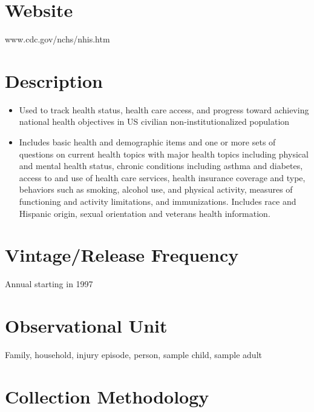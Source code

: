 \documentclass[
]{book}
\providecommand{\tightlist}{%
  \setlength{\itemsep}{0pt}\setlength{\parskip}{0pt}}
\begin{document}
\hypertarget{website-51}{%
\section{Website}\label{website-51}}

www.cdc.gov/nchs/nhis.htm

\hypertarget{description-51}{%
\section{Description}\label{description-51}}

\begin{itemize}
\tightlist
\item
  Used to track health status, health care access, and progress toward achieving national health objectives in US civilian non-institutionalized population
\item
  Includes basic health and demographic items and one or more sets of questions on current health topics with major health topics including physical and mental health status, chronic conditions including asthma and diabetes, access to and use of health care services, health insurance coverage and type, behaviors such as smoking, alcohol use, and physical activity, measures of functioning and activity limitations, and immunizations. Includes race and Hispanic origin, sexual orientation and veterans health information.
\end{itemize}

\hypertarget{vintagerelease-frequency-51}{%
\section{Vintage/Release Frequency}\label{vintagerelease-frequency-51}}

Annual starting in 1997

\hypertarget{observational-unit-51}{%
\section{Observational Unit}\label{observational-unit-51}}

Family, household, injury episode, person, sample child, sample adult

\hypertarget{collection-methodology-51}{%
\section{Collection Methodology}\label{collection-methodology-51}}
\end{document}
